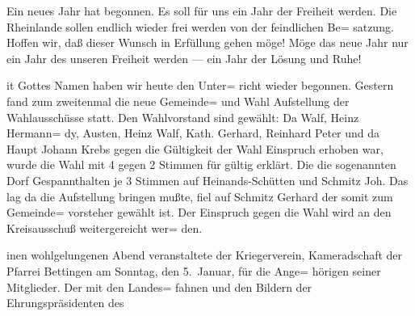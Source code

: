 

\pstart
Ein neues Jahr hat begonnen. Es soll für uns\ob
ein Jahr der Freiheit werden. Die Rheinlande sollen\ob
endlich wieder frei werden von der feindlichen Be=\ob
satzung. Hoffen wir, daß dieser Wunsch in Erfüllung\ob
gehen möge! Möge das neue Jahr nur ein Jahr\ob
des unseren Freiheit werden — ein Jahr der Lösung\ob
und Ruhe!

%
it Gottes Namen haben wir heute den Unter=\ob
richt wieder begonnen.\ob
Gestern fand zum zweitenmal die neue Gemeinde=\ob
und Wahl Aufstellung der Wahlausschüsse statt. Den\ob
Wahlvorstand sind gewählt: Da Walf, Heinz Hermann=\ob
dy\unsicher, Austen, Heinz Walf, Kath. Gerhard, Reinhard Peter\ob
und da Haupt Johann Krebs gegen die Gültigkeit der\ob
Wahl Einspruch erhoben war, wurde die Wahl\ob
mit 4 gegen 2 Stimmen für gültig erklärt. Die\ob
die sogenannten Dorf Gespannt\unsicher halten je 3\ob
Stimmen auf Heinands-Schütten und Schmitz Joh.\ob
Das lag da die Aufstellung bringen mußte,\ob
fiel auf Schmitz Gerhard der somit zum Gemeinde=\ob
vorsteher gewählt ist. Der Einspruch gegen die Wahl\ob
wird an den Kreisausschuß weitergereicht wer=\ob
den.

%
inen wohlgelungenen Abend veranstaltete\ob
der Kriegerverein, Kameradschaft der Pfarrei\ob
Bettingen am Sonntag, den 5.\ Januar, für die Ange=\ob
hörigen seiner Mitglieder. Der mit den Landes=\ob
fahnen und den Bildern der Ehrungspräsidenten des
\pend
